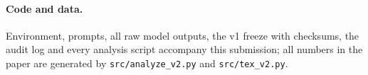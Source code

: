 \paragraph{Code and data.} Environment, prompts, all raw model outputs, the v1 freeze with checksums, the audit log and every analysis script accompany this submission; all numbers in the paper are generated by \texttt{src/analyze\_v2.py} and \texttt{src/tex\_v2.py}.







